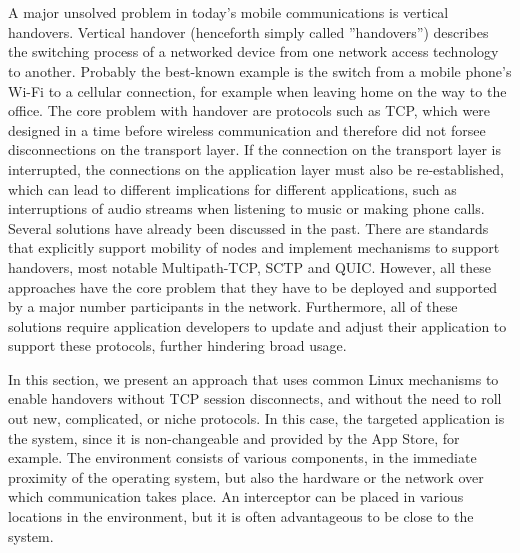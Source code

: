 \section{\wgh}
\label{sec:wg:impl}

\newcommand{\ld}{\texttt{LD\_PRELOAD}\xspace}


A major unsolved problem in today's mobile communications is vertical handovers.
Vertical handover (henceforth simply called ''handovers'') describes the switching process of a networked device from one network access technology to another.
Probably the best-known example is the switch from a mobile phone's Wi-Fi to a cellular connection, for example when leaving home on the way to the office.
The core problem with handover are protocols such as TCP, which were designed in a time before wireless communication and therefore did not forsee disconnections on the transport layer.
If the connection on the transport layer is interrupted, the connections on the application layer must also be re-established, which can lead to different implications for different applications, such as interruptions of audio streams when listening to music or making phone calls.
Several solutions have already been discussed in the past.
There are standards that explicitly support mobility of nodes and implement mechanisms to support handovers, most notable Multipath-TCP, SCTP and QUIC.
However, all these approaches have the core problem that they have to be deployed and supported by a major number participants in the network.
Furthermore, all of these solutions require application developers to update and adjust their application to support these protocols, further hindering broad usage.

In this section, we present an approach that uses common Linux mechanisms to enable handovers without TCP session disconnects, and without the need to roll out new, complicated, or niche protocols.
In this case, the targeted application is the system, since it is non-changeable and provided by the App Store, for example.
The environment consists of various components, in the immediate proximity of the operating system, but also the hardware or the network over which communication takes place.
An interceptor can be placed in various locations in the environment, but it is often advantageous to be close to the system. 





